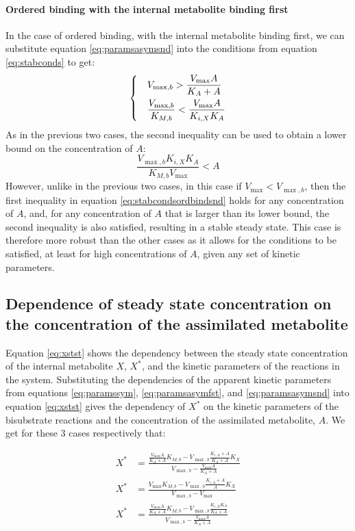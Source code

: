   \paragraph{Ordered binding with the internal metabolite binding first}
  In the case of ordered binding, with the internal metabolite binding first, we can substitute equation \ref{eq:paramsasymsnd} into the conditions from equation \ref{eq:stabconds} to get:
  \begin{equation}
    \label{eq:stabcondsordbindsnd}
    \begin{dcases}
      & V_{\max,b}>\frac{V_{\max}A}{K_A+A} \\
      & \frac{V_{\max,b}}{K_{M,b}}<\frac{V_{\max}A}{K_{i,X}K_A}
    \end{dcases}
  \end{equation}
  As in the previous two cases, the second inequality can be used to obtain a lower bound on the concentration of $A$:
  \begin{equation}
      \label{eq:assimlowerboundasym}
    \frac{V_{\max,b}K_{i,X}K_A}{K_{M,b}V_{\max}}<A
  \end{equation}
  However, unlike in the previous two cases, in this case if $V_{\max}<V_{\max,b}$, then the first inequality in equation \ref{eq:stabcondsordbindsnd} holds for any concentration of $A$, and, for any concentration of $A$ that is larger than its lower bound, the second inequality is also satisfied, resulting in a stable steady state.
  This case is therefore more robust than the other cases as it allows for the conditions to be satisfied, at least for high concentrations of $A$, given any set of kinetic parameters.
  \subsection{Dependence of steady state concentration on the concentration of the assimilated metabolite}
  Equation \ref{eq:xstst} shows the dependency between the steady state concentration of the internal metabolite $X$, $X^*$, and the kinetic parameters of the reactions in the system.
  Substituting the dependencies of the apparent kinetic parameters from equations \ref{eq:paramssym}, \ref{eq:paramsasymfst}, and \ref{eq:paramsasymsnd} into equation \ref{eq:xstst} gives the dependency of $X^*$ on the kinetic parameters of the bisubstrate reactions and the concentration of the assimilated metabolite, $A$.
  We get for these 3 cases respectively that:

  \begin{align}
      X^* &= \frac{\frac{V_{\max}A}{K_A+A}K_{M,b}-V_{\max,b}\frac{K_{i,A}+A}{K_A+A}K_X}
      {V_{\max,b}-\frac{V_{\max}A}{K_A+A}} \label{eq:xststrand} \\
      X^* &= \frac{V_{\max}K_{M,b}-V_{\max,b}\frac{K_{i,A}+A}{A}K_X}
      {V_{\max,b}-V_{\max}}\label{eq:xststordfst} \\
      X^* &= \frac{\frac{V_{\max}A}{K_A+A}K_{M,b}-V_{\max,b}\frac{K_{i,X}K_A}{K_A+A} }
      { V_{\max,b}-\frac{V_{\max}A}{K_A+A} }\label{eq:xststordsnd}
  \end{align}

